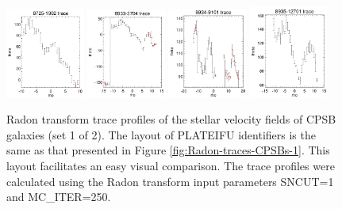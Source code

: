 \documentclass[fleqn,usenatbib]{mnras}
\begin{document}
\begin{figure}
    \includegraphics[width=0.23\textwidth]{Images/SN1-MC250/CPSBs/8725-1902-1-250.png}
    \includegraphics[width=0.23\textwidth]{Images/SN1-MC250/CPSBs/8933-3704-1-250.png}
    \includegraphics[width=0.23\textwidth]{Images/SN1-MC250/CPSBs/8934-9101-1-250.png}
    \includegraphics[width=0.23\textwidth]{Images/SN1-MC250/CPSBs/8935-12701-1-250.png}    
    \caption{Radon transform trace profiles of the stellar velocity fields of CPSB galaxies (set 1 of 2). The layout of PLATEIFU identifiers is the same as that presented in Figure \ref{fig:Radon-traces-CPSBs-1}. This layout facilitates an easy visual comparison. The trace profiles were calculated using the Radon transform input parameters SNCUT=1 and MC\_ITER=250.}
    \label{fig:Radon-traces-CPSBs-1-SN1-MC250}
\end{figure}
\end{document}
